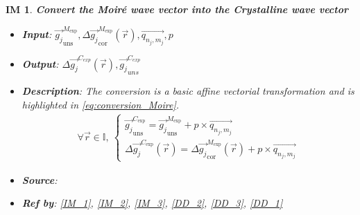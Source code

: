 \documentclass[12pt]{article}
\newtheorem{IM}{IM}
\begin{document}
\begin{IM}
\label{IM_4}
\noindent\colorbox{shadecolorIM}{\normalfont \textbf{Convert the Moir{\'e} wave vector into the Crystalline wave vector}}
\normalfont
\begin{itemize}
\item \textbf{Input}: $\overrightarrow{g_{j}}_{\text{uns}}^{M_{\text{exp}}},\Delta\overrightarrow{g_{j}}_{\text{cor}}^{M_{\text{exp}}}(\vec{r}),\overrightarrow{q_{n_j,m_j}},p$
\item \textbf{Output}: $\Delta \overrightarrow{g_{j}}^{C_{exp}}(\vec{r}),\overrightarrow{g_{j}}_{uns}^{C_{exp}}$
\item \textbf{Description}: The conversion is a basic affine vectorial transformation and is highlighted in \cref{eq:conversion_Moire}.
\begin{equation}
\label{eq:conversion_Moire}
\begin{gathered}
\forall \vec{r} \in \mathbb{I}, \ \begin{cases}
\overrightarrow{g_{j}}_{\text{uns}}^{C_{\text{exp}}}= \overrightarrow{g_{j}}_{\text{uns}}^{M_{\text{exp}}} + p \times \overrightarrow{q_{n_j,m_j}} \\
\Delta \overrightarrow{g_{j}}^{C_{\text{exp}}}(\vec{r})= \Delta\overrightarrow{g_{j}}_{\text{cor}}^{M_{\text{exp}}}(\vec{r}) + p \times \overrightarrow{q_{n_j,m_j}}
\end{cases}
\end{gathered}
\end{equation}
\item \textbf{Source}: \cite{Pofelski2017}
\item \textbf{Ref by}: \cref{IM_1}, \cref{IM_2}, \cref{IM_3}, \cref{DD_2}, \cref{DD_3}, \cref{DD_1}
\end{itemize}
\end{IM}
\end{document}

